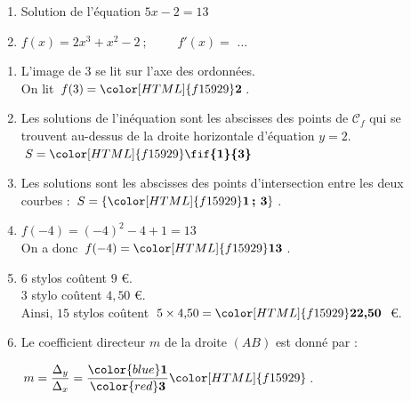 \documentclass[a4paper,11pt,landscape,exos]{nsi} %
\begin{document}
\begin{multicols}{2}
\begin{enumerate}[itemsep=.9em]
	\item Solution de l'équation $5x-2=13$

	
	\item $f(x)=2x^3+x^2-2\ ; \qquad$
    $f'(x)=$ $\ldots$

\end{enumerate}
\vfill
\end{multicols}



\newpage

\begin{multicols}{2}
    \maketitle
\begin{enumerate}[itemsep=.75em]
    \item L'image de $3$ se lit sur l'axe des ordonnées. \\
              On lit $f(3)={\color[HTML]{f15929}\boldsymbol{2}}$. 
\item Les solutions de l'inéquation sont les abscisses des points de $\mathcal{C}_f$ qui se trouvent au-dessus de la droite horizontale d'équation $y=2$.\\
    $S={\color[HTML]{f15929}\boldsymbol{\fif{1}{3}}}$ 
\item Les solutions sont les abscisses des points d'intersection entre les deux courbes :
   $S=\{{\color[HTML]{f15929}\boldsymbol{1\,;\,3}}\}$. 
\item $f(-4)=\left(-4 \right)^2 -4 +1 = 13$\\
    On a donc $f(-4)={\color[HTML]{f15929}\boldsymbol{13}}$.
\item $6$ stylos coûtent $9$ €.\\
          $3$ stylo coûtent  $4{,}50$ €.\\
          Ainsi,   $15$ stylos coûtent $5\times 4{,}50 ={\color[HTML]{f15929}\boldsymbol{22{,}50}}$ €.
\item Le coefficient directeur $m$ de la droite $(AB)$ est donné par :

\medskip

            $m=\dfrac{\Delta_y}{\Delta_x}=\dfrac{{\color{blue}\boldsymbol{1}}}{{\color{red}\boldsymbol{3}}}{\color[HTML]{f15929}\boldsymbol{}}$.


\end{enumerate}
\end{multicols}
\end{document}
